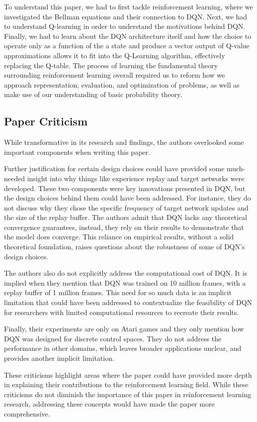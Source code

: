 \documentclass{article}
\begin{document}
To understand this paper, we had to first tackle reinforcement learning, where we investigated the Bellman equations and their connection to DQN. Next, we had to understand Q-learning in order to understand the motivations behind DQN. Finally, we had to learn about the DQN architecture itself and how the choice to operate only as a function of the a state and produce a vector output of Q-value approximations allows it to fit into the Q-Learning algorithm, effectively replacing the Q-table. The process of learning the fundamental theory surrounding reinforcement learning overall required us to reform how we approach representation, evaluation, and optimization of problems, as well as make use of our understanding of basic probability theory.

\subsection{Paper Criticism}
While transformative in its research and findings, the authors overlooked some important components when writing this paper.

Further justification for certain design choices could have provided some much-needed insight into why things like experience replay and target networks were developed. These two components were key innovations presented in DQN, but the design choices behind them could have been addressed. For instance, they do not discuss why they chose the specific frequency of target network updates and the size of the replay buffer. The authors admit that DQN lacks any theoretical convergence guarantees, instead, they rely on their results to demonstrate that the model does converge. This reliance on empirical results, without a solid theoretical foundation, raises questions about the robustness of some of DQN's design choices. 

The authors also do not explicitly address the computational cost of DQN. It is implied when they mention that DQN was trained on 10 million frames, with a replay buffer of 1 million frames. This need for so much data is an implicit limitation that could have been addressed to contextualize the feasibility of DQN for researchers with limited computational resources to recreate their results. 

Finally, their experiments are only on Atari games and they only mention how DQN was designed for discrete control spaces. They do not address the performance in other domains, which leaves broader applications unclear, and provides another implicit limitation. 

These criticisms highlight areas where the paper could have provided more depth in explaining their contributions to the reinforcement learning field. While these criticisms do not diminish the importance of this paper in reinforcement learning research, addressing these concepts would have made the paper more comprehensive.  



\end{document}
